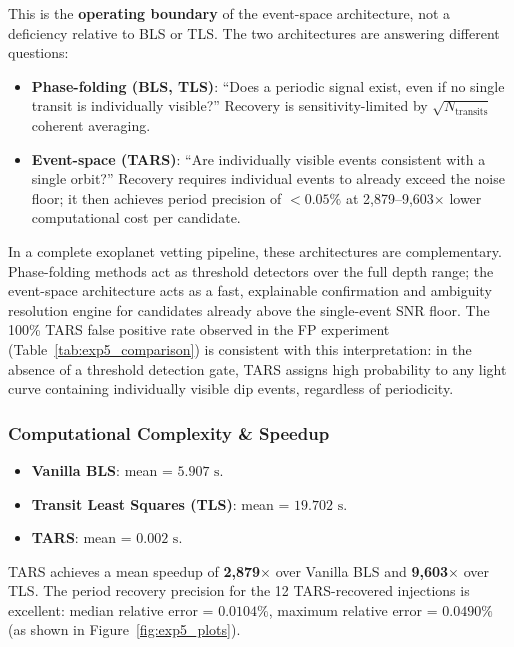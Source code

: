 This is the \textbf{operating boundary} of the event-space architecture, not a deficiency relative to BLS or TLS. The two architectures are answering different questions:

\begin{itemize}
    \item \textbf{Phase-folding (BLS, TLS)}: ``Does a periodic signal exist, even if no single transit is individually visible?'' Recovery is sensitivity-limited by $\sqrt{N_\text{transits}}$ coherent averaging.
    \item \textbf{Event-space (TARS)}: ``Are individually visible events consistent with a single orbit?'' Recovery requires individual events to already exceed the noise floor; it then achieves period precision of $<0.05\%$ at 2,879--9,603$\times$ lower computational cost per candidate.
\end{itemize}

In a complete exoplanet vetting pipeline, these architectures are complementary. Phase-folding methods act as threshold detectors over the full depth range; the event-space architecture acts as a fast, explainable confirmation and ambiguity resolution engine for candidates already above the single-event SNR floor. The 100\% TARS false positive rate observed in the FP experiment (Table~\ref{tab:exp5_comparison}) is consistent with this interpretation: in the absence of a threshold detection gate, TARS assigns high probability to any light curve containing individually visible dip events, regardless of periodicity.



\subsubsection{Computational Complexity \& Speedup}
\begin{itemize}
    \item \textbf{Vanilla BLS}: mean = $5.907\text{ s}$.
    \item \textbf{Transit Least Squares (TLS)}: mean = $19.702\text{ s}$.
    \item \textbf{TARS}: mean = $0.002\text{ s}$.
\end{itemize}
TARS achieves a mean speedup of \textbf{2{,}879$\times$} over Vanilla BLS and \textbf{9{,}603$\times$} over TLS. The period recovery precision for the 12 TARS-recovered injections is excellent: median relative error = $0.0104\%$, maximum relative error = $0.0490\%$ (as shown in Figure~\ref{fig:exp5_plots}).

